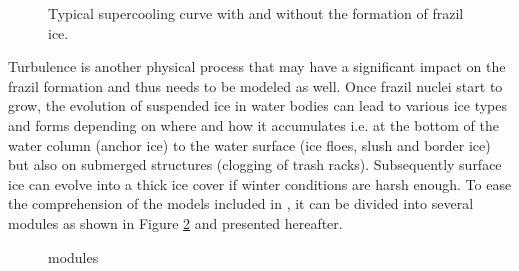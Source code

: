 \begin{figure}[H]
    \begin{center}
    \end{center}
    \caption{Typical supercooling curve with and without the formation of frazil ice. }
    \label{fig:supercooling}
\end{figure}

Turbulence is another physical process that may have a significant impact on the frazil formation
and thus needs to be modeled as well.
Once frazil nuclei start to grow, the evolution of suspended ice in water bodies
can lead to various ice types and forms depending on where and how it accumulates i.e.
at the bottom of the water column (anchor ice) to the water surface (ice floes, slush and border ice) but also
on submerged structures (clogging of trash racks).
Subsequently surface ice can evolve into a thick ice cover if winter conditions are harsh enough.
To ease the comprehension of the models included in
\khione, it can be divided into several modules as shown in Figure \ref{fig:khione_modules} and presented hereafter.

\begin{figure}[H]
    \begin{center}
    \end{center}
    \caption{\khione modules}
    \label{fig:khione_modules}
\end{figure}

